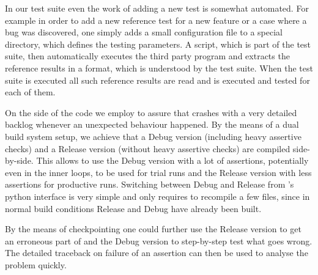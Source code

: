 In our test suite even the work of adding a new test is somewhat automated.
For example in order to add a new reference test for a new feature
or a case where a bug was discovered,
one simply adds a small configuration file to a special directory,
which defines the testing parameters.
A \python script, which is part of the test suite,
then automatically executes the third party program and extracts the reference results in a format,
which is understood by the \molsturm test suite.
When the test suite is executed all such reference results are read and
\molsturm is executed and tested for each of them.


On the side of the \molsturm code we employ  to assure that
\molsturm crashes with a very detailed backlog whenever an unexpected behaviour happened.
By the means of a dual build system setup, we achieve that a Debug version
(including heavy assertive checks) and a Release version
(without heavy assertive checks) are compiled side-by-side.
This allows to use the Debug version with a lot of assertions,
potentially even in the inner loops,
to be used for trial runs and the Release version with less assertions for productive runs.
Switching between Debug and Release from \molsturm's python interface is very simple and
only requires to recompile a few files,
since in normal build conditions Release and Debug have already been built.

By the means of checkpointing one could further use the Release version to get an erroneous
part of \molsturm and the Debug version to step-by-step test what goes wrong.
The detailed traceback on failure of an assertion can then be used to analyse the problem quickly.
